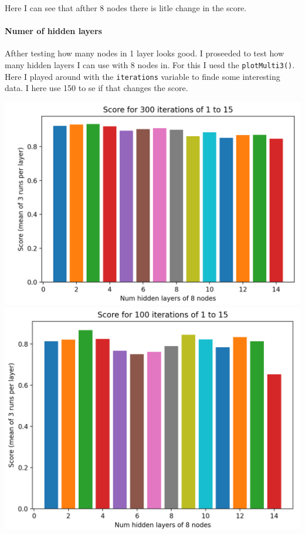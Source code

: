 \documentclass[10pt]{article}
\begin{document}
        Here I can see that afther 8 nodes there is litle change in the score.

        \paragraph{Numer of hidden layers}
        Afther testing how many nodes in 1 layer looks good. I proseeded to test how many hidden layers I can use with 8 nodes in. For this I uesd the \texttt{plotMulti3()}. Here I played around with the \texttt{iterations} variable to finde some interesting data. I here use 150 to se if that changes the score.

        \includegraphics[scale=0.4]{Figure_2-1}
        \includegraphics[scale=0.4]{Figure_2-2}
\end{document}

